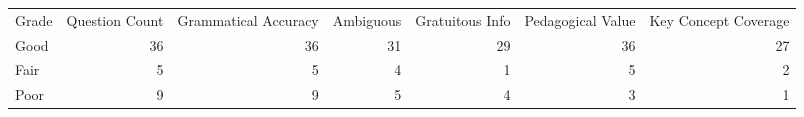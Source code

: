 \begin{tabular}{lrrrrrr}
Grade & Question Count & Grammatical Accuracy & Ambiguous & Gratuitous Info & Pedagogical Value & Key Concept Coverage \\
Good & 36 & 36 & 31 & 29 & 36 & 27 \\
Fair & 5 & 5 & 4 & 1 & 5 & 2 \\
Poor & 9 & 9 & 5 & 4 & 3 & 1 \\
\end{tabular}
